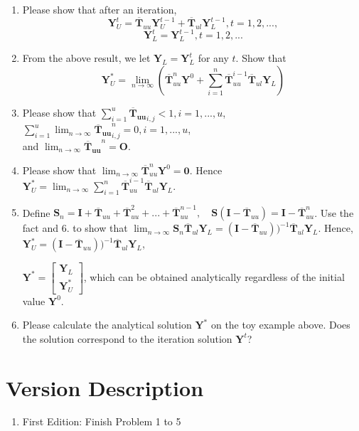 \documentclass{article}
\begin{document}
\begin{enumerate}[resume]
\item Please show that after an iteration,
$$ \boldsymbol{Y}^{t}_U = \boldsymbol{\overline{T}}_{uu} \boldsymbol{Y}^{t-1}_U + \boldsymbol{\overline{T}}_{ul} \boldsymbol{Y}^{t-1}_L, t = 1,2,...,$$
$$\boldsymbol{Y}^{t}_L =  \boldsymbol{Y}^{t-1}_L, t = 1, 2,...$$
\item From the above result, we let $\boldsymbol{Y}_L=\boldsymbol{Y}^{t}_L$ for any $t$. Show that 
$$ \boldsymbol{Y}^{*}_U =  \lim_{n\to\infty} (\boldsymbol{\overline{T}}_{uu}^n \boldsymbol{Y}^{0} + \sum_{i=1}^n \boldsymbol{\overline{T}}_{uu}^{i-1} \boldsymbol{\overline{T}}_{ul} \boldsymbol{Y}_L)$$

\item Please show that $\sum_{i=1}^u \boldsymbol{\overline{T}_{uu}}_{i,j} < 1, i=1,...,u$, $\sum_{i=1}^u \lim_{n\to\infty} \boldsymbol{\overline{T}_{uu}}_{i,j}^n = 0, i=1,...,u$, \\ and $\lim_{n\to\infty} \boldsymbol{\overline{T}_{uu}}^n = \boldsymbol{O}$.

\item Please show that $\lim_{n\to\infty} \boldsymbol{\overline{T}}_{uu}^n \boldsymbol{Y}^{0} = \boldsymbol{0}$. Hence $\boldsymbol{Y}^{*}_U = \lim_{n\to\infty}\sum_{i=1}^n \boldsymbol{\overline{T}}_{uu}^{i-1} \boldsymbol{\overline{T}}_{ul} \boldsymbol{Y}_L$.

\item Define $\boldsymbol{S}_n = \boldsymbol{I} + \boldsymbol{\overline{T}}_{uu} + \boldsymbol{\overline{T}}_{uu}^2 + ... + \boldsymbol{\overline{T}}_{uu}^{n-1}, \quad \boldsymbol{S}(\boldsymbol{I}-\boldsymbol{\overline{T}}_{uu}) = \boldsymbol{I} - \boldsymbol{\overline{T}}_{uu}^{n}$. Use the fact and 6. to show that 
$\lim_{n\to\infty}\boldsymbol{S}_n \boldsymbol{\overline{T}}_{ul} \boldsymbol{Y}_L = (\boldsymbol{I}-\boldsymbol{\overline{T}}_{uu}))^{-1}\boldsymbol{\overline{T}}_{ul} \boldsymbol{Y}_L$. Hence, $\boldsymbol{Y}^{*}_U = (\boldsymbol{I}-\boldsymbol{\overline{T}}_{uu}))^{-1}\boldsymbol{\overline{T}}_{ul} \boldsymbol{Y}_L$, 

$\boldsymbol{Y}^{*}=
\begin{bmatrix}
\boldsymbol{Y}_L \\
\boldsymbol{Y}^{*}_U
\end{bmatrix}
$, which can be obtained analytically regardless of the initial value $\boldsymbol{Y}^0$. 

\item Please calculate the analytical solution $\boldsymbol{Y}^{*}$ on the toy example above. Does the solution correspond to the iteration solution $\boldsymbol{Y}^{t}$?
\end{enumerate}

 \section*{Version Description}
 \begin{enumerate}
     \item First Edition: Finish Problem 1 to 5
 \end{enumerate}
\end{document}
